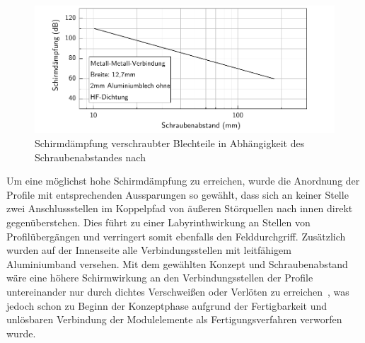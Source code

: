 \begin{figure}[ht]
    \centering
    \includegraphics[page = 1, trim = 0cm 0cm 0cm 0cm, clip, width=.99\textwidth]{Abbildungen/Kapitel3/Schraubenabstand_Schirmwirkung.pdf}
    \caption[Schirmdämpfung verschraubter Blechteile in Abhängigkeit des Schraubenabstandes]{Schirmdämpfung verschraubter Blechteile in Abhängigkeit des Schraubenabstandes nach~\cite{Design_of_shielded_enclosures}}
    \label{fig:3_Schirmwirkung_Schraubenabstand}
\end{figure}


Um eine möglichst hohe Schirmdämpfung zu erreichen, wurde die Anordnung der Profile mit entsprechenden Aussparungen so gewählt, dass sich an keiner Stelle zwei Anschlussstellen im Koppelpfad von äußeren Störquellen nach innen direkt gegenüberstehen. Dies führt zu einer Labyrinthwirkung an Stellen von Profilübergängen und verringert somit ebenfalls den Felddurchgriff. Zusätzlich wurden auf der Innenseite alle Verbindungsstellen mit leitfähigem Aluminiumband versehen. Mit dem gewählten Konzept und Schraubenabstand wäre eine höhere Schirmwirkung an den Verbindungsstellen der Profile untereinander nur durch dichtes Verschweißen oder Verlöten zu erreichen~\cite{Design_of_shielded_enclosures, EM_Schirmung}, was jedoch schon zu Beginn der Konzeptphase aufgrund der Fertigbarkeit und unlösbaren Verbindung der Modulelemente als Fertigungsverfahren verworfen wurde. 
\par
\vspace{\linespace}


    




